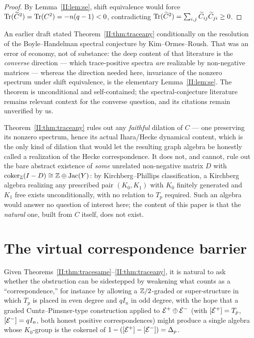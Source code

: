 \begin{proof}
By Lemma~\ref{II:lem:se}, shift equivalence would force
$\operatorname{Tr}(\widetilde C^2)=\operatorname{Tr}(C^2)=-n(q-1)<0$, contradicting
$\operatorname{Tr}(\widetilde C^2)=\sum_{i,j}\widetilde C_{ij}\widetilde C_{ji}\ge0$.
\end{proof}

\begin{remark}
An earlier draft stated Theorem~\ref{II:thm:traceany} conditionally on the resolution of
the Boyle--Handelman spectral conjecture by Kim--Ormes--Roush. That was an error of
economy, not of substance: the deep content of that literature is the \emph{converse}
direction --- which trace-positive spectra \emph{are} realizable by non-negative
matrices --- whereas the direction needed here, invariance of the nonzero spectrum under
shift equivalence, is the elementary Lemma~\ref{II:lem:se}. The theorem is unconditional
and self-contained; the spectral-conjecture literature remains relevant context for the
converse question, and its citations remain unverified by us.
\end{remark}

\begin{remark}\label{II:rem:scope}
Theorem~\ref{II:thm:traceany} rules out any \emph{faithful} dilation of $C$ --- one
preserving its nonzero spectrum, hence its actual Ihara/Hecke dynamical content, which is
the only kind of dilation that would let the resulting graph algebra be honestly called a
realization of the Hecke correspondence. It does not, and cannot, rule out the bare
abstract existence of \emph{some} unrelated non-negative matrix $D$ with
$\operatorname{coker}_{\mathbb{Z}}(I-D)\cong\mathbb{Z}\oplus\operatorname{Jac}(Y)$: by Kirchberg--Phillips classification, a Kirchberg
algebra realizing any prescribed pair $(K_0,K_1)$ with $K_0$ finitely generated and $K_1$
free exists unconditionally, with no relation to $T_p$ required. Such an algebra would
answer no question of interest here; the content of this paper is that the
\emph{natural} one, built from $C$ itself, does not exist.
\end{remark}

\section{The virtual correspondence barrier}\label{II:sec:barrier}

Given Theorems~\ref{II:thm:tracesame}--\ref{II:thm:traceany}, it is natural to ask whether the
obstruction can be sidestepped by weakening what counts as a ``correspondence,'' for
instance by allowing a $\mathbb{Z}/2$-graded or super-structure in which $T_p$ is placed in even
degree and $qI_n$ in odd degree, with the hope that a graded Cuntz--Pimsner-type
construction applied to $\mathcal{E}^+\oplus\mathcal{E}^-$ (with $[\mathcal{E}^+]=T_p$, $[\mathcal{E}^-]=qI_n$, both
honest positive correspondences) might produce a single algebra whose $K_0$-group is the
cokernel of $1-([\mathcal{E}^+]-[\mathcal{E}^-])=\Delta_p$.

